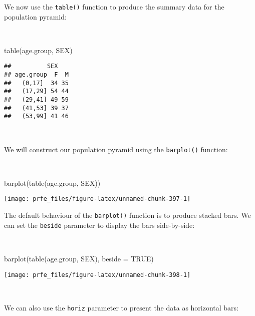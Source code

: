 \documentclass[
  12pt,
  a4paper]{book}
\newenvironment{Shaded}{\begin{snugshade}}{\end{snugshade}}
\newcommand{\AttributeTok}[1]{\textcolor[rgb]{0.77,0.63,0.00}{#1}}
\newcommand{\ConstantTok}[1]{\textcolor[rgb]{0.00,0.00,0.00}{#1}}
\newcommand{\FunctionTok}[1]{\textcolor[rgb]{0.00,0.00,0.00}{#1}}
\newcommand{\NormalTok}[1]{#1}
\begin{document}
\newpage

We now use the \texttt{table()} function to produce the summary data for the population pyramid:

~

\begin{Shaded}
\begin{Highlighting}[]
\FunctionTok{table}\NormalTok{(age.group, SEX)}
\end{Highlighting}
\end{Shaded}

\begin{verbatim}
##          SEX
## age.group  F  M
##   (0,17]  34 35
##   (17,29] 54 44
##   (29,41] 49 59
##   (41,53] 39 37
##   (53,99] 41 46
\end{verbatim}

~

We will construct our population pyramid using the \texttt{barplot()} function:

~

\begin{Shaded}
\begin{Highlighting}[]
\FunctionTok{barplot}\NormalTok{(}\FunctionTok{table}\NormalTok{(age.group, SEX))}
\end{Highlighting}
\end{Shaded}

\begin{center}\texttt{[image: prfe\_files/figure-latex/unnamed-chunk-397-1]} \end{center}

\newpage

The default behaviour of the \texttt{barplot()} function is to produce stacked bars. We can set the \texttt{beside} parameter to display the bars side-by-side:

~

\begin{Shaded}
\begin{Highlighting}[]
\FunctionTok{barplot}\NormalTok{(}\FunctionTok{table}\NormalTok{(age.group, SEX), }\AttributeTok{beside =} \ConstantTok{TRUE}\NormalTok{)}
\end{Highlighting}
\end{Shaded}

\begin{center}\texttt{[image: prfe\_files/figure-latex/unnamed-chunk-398-1]} \end{center}

~

We can also use the \texttt{horiz} parameter to present the data as horizontal bars:
\end{document}
